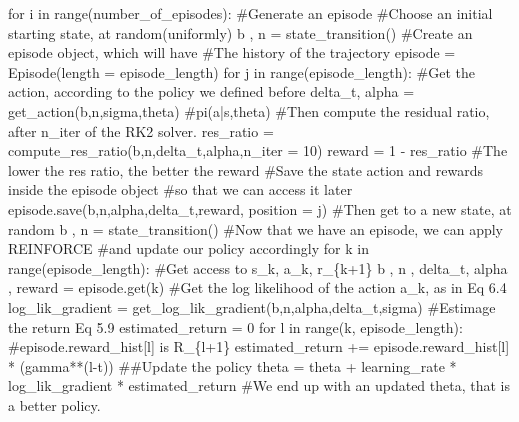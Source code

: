 \documentclass[
  letterpaper,
]{report}
\newenvironment{Shaded}{\begin{snugshade}}{\end{snugshade}}
\newcommand{\BuiltInTok}[1]{\textcolor[rgb]{0.00,0.23,0.31}{#1}}
\newcommand{\CommentTok}[1]{\textcolor[rgb]{0.37,0.37,0.37}{#1}}
\newcommand{\ControlFlowTok}[1]{\textcolor[rgb]{0.00,0.23,0.31}{#1}}
\newcommand{\DecValTok}[1]{\textcolor[rgb]{0.68,0.00,0.00}{#1}}
\newcommand{\KeywordTok}[1]{\textcolor[rgb]{0.00,0.23,0.31}{#1}}
\newcommand{\NormalTok}[1]{\textcolor[rgb]{0.00,0.23,0.31}{#1}}
\newcommand{\OperatorTok}[1]{\textcolor[rgb]{0.37,0.37,0.37}{#1}}
\theoremstyle{definition}
\theoremstyle{plain}
\theoremstyle{definition}
\theoremstyle{remark}
\begin{document}
\begin{Shaded}
\begin{Highlighting}[]
\ControlFlowTok{for}\NormalTok{ i }\KeywordTok{in} \BuiltInTok{range}\NormalTok{(number\_of\_episodes):}
    \CommentTok{\#Generate an episode}
    \CommentTok{\#Choose an initial starting state, at random(uniformly)}
\NormalTok{    b , n }\OperatorTok{=}\NormalTok{ state\_transition()}
    \CommentTok{\#Create an episode object, which will have }
    \CommentTok{\#The history of the trajectory}
\NormalTok{    episode }\OperatorTok{=}\NormalTok{ Episode(length }\OperatorTok{=}\NormalTok{ episode\_length)}
    \ControlFlowTok{for}\NormalTok{ j }\KeywordTok{in} \BuiltInTok{range}\NormalTok{(episode\_length):}
        \CommentTok{\#Get the action, according to the policy we defined before}
\NormalTok{        delta\_t, alpha }\OperatorTok{=}\NormalTok{ get\_action(b,n,sigma,theta) }\CommentTok{\#pi(a|s,theta)}
        \CommentTok{\#Then compute the residual ratio, after n\_iter of the RK2 solver.}
\NormalTok{        res\_ratio }\OperatorTok{=}\NormalTok{ compute\_res\_ratio(b,n,delta\_t,alpha,n\_iter }\OperatorTok{=} \DecValTok{10}\NormalTok{)}
\NormalTok{        reward }\OperatorTok{=} \DecValTok{1} \OperatorTok{{-}}\NormalTok{ res\_ratio }\CommentTok{\#The lower the res ratio, the better the reward}
        \CommentTok{\#Save the state action and rewards inside the episode object}
        \CommentTok{\#so that we can access it later}
\NormalTok{        episode.save(b,n,alpha,delta\_t,reward, position }\OperatorTok{=}\NormalTok{ j)}
        \CommentTok{\#Then get to a new state, at random}
\NormalTok{        b , n }\OperatorTok{=}\NormalTok{ state\_transition()}
    \CommentTok{\#Now that we have an episode, we can apply REINFORCE}
    \CommentTok{\#and update our policy accordingly}
    \ControlFlowTok{for}\NormalTok{ k }\KeywordTok{in} \BuiltInTok{range}\NormalTok{(episode\_length):}
        \CommentTok{\#Get access to s\_k, a\_k, r\_\{k+1\}}
\NormalTok{        b , n , delta\_t, alpha , reward }\OperatorTok{=}\NormalTok{ episode.get(k)}
        \CommentTok{\#Get the log likelihood of the action a\_k, as in Eq 6.4}
\NormalTok{        log\_lik\_gradient }\OperatorTok{=}\NormalTok{ get\_log\_lik\_gradient(b,n,alpha,delta\_t,sigma)}
        \CommentTok{\#Estimage the return Eq 5.9}
\NormalTok{        estimated\_return }\OperatorTok{=} \DecValTok{0}
        \ControlFlowTok{for}\NormalTok{ l }\KeywordTok{in} \BuiltInTok{range}\NormalTok{(k, episode\_length):}
            \CommentTok{\#episode.reward\_hist[l] is R\_\{l+1\}}
\NormalTok{            estimated\_return }\OperatorTok{+=}\NormalTok{ episode.reward\_hist[l] }\OperatorTok{*}\NormalTok{ (gamma}\OperatorTok{**}\NormalTok{(l}\OperatorTok{{-}}\NormalTok{t))}
        \CommentTok{\#\#Update the policy}
\NormalTok{        theta }\OperatorTok{=}\NormalTok{ theta }\OperatorTok{+}\NormalTok{ learning\_rate }\OperatorTok{*}\NormalTok{ log\_lik\_gradient }\OperatorTok{*}\NormalTok{ estimated\_return}
\CommentTok{\#We end up with an updated theta, that is a better policy.}
\end{Highlighting}
\end{Shaded}
\end{document}
